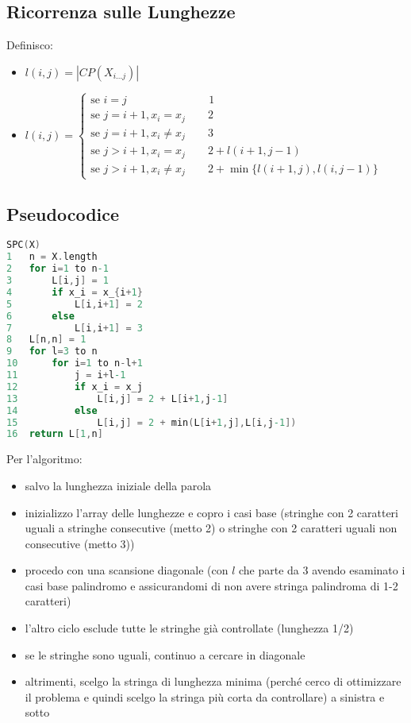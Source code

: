 \subsection{Ricorrenza sulle Lunghezze}
Definisco:
\begin{itemize}
    \item $l(i,j) = |CP(X_{i \ldots j})|$
    \item $l(i,j) = \begin{cases}
        \text{se } i = j \qquad\qquad\qquad\;\;\;\;\; 1 \\
        \text{se } j = i+1, x_i = x_j \qquad 2\\
        \text{se } j = i+1, x_i \not= x_j \qquad 3\\
        \text{se } j > i+1, x_i = x_j \qquad 2 + l(i+1,j-1)\\
        \text{se } j > i+1, x_i \not= x_j \qquad 2 + \min\{l(i+1,j),l(i,j-1)\}
    \end{cases}$
\end{itemize}

\newpage
\subsection{Pseudocodice}
\begin{mdframed}
\begin{lstlisting}[language=C]
SPC(X)
1   n = X.length
2   for i=1 to n-1
3       L[i,j] = 1
4       if x_i = x_{i+1}
5           L[i,i+1] = 2
6       else
7           L[i,i+1] = 3
8   L[n,n] = 1
9   for l=3 to n
10      for i=1 to n-l+1
11          j = i+l-1
12          if x_i = x_j
13              L[i,j] = 2 + L[i+1,j-1]
14          else
15              L[i,j] = 2 + min(L[i+1,j],L[i,j-1])
16  return L[1,n]
\end{lstlisting}
\end{mdframed}
Per l’algoritmo:
\begin{itemize}
    \item salvo la lunghezza iniziale della parola
    \item inizializzo l'array delle lunghezze e copro i casi base (stringhe con 2 caratteri uguali a stringhe consecutive (metto 2) o stringhe con 2 caratteri uguali non consecutive (metto 3))
    \item procedo con una scansione diagonale (con $l$ che parte da 3 avendo esaminato i casi base palindromo e assicurandomi di non avere stringa palindroma di 1-2 caratteri)
    \item l'altro ciclo esclude tutte le stringhe già controllate (lunghezza 1/2)
    \item se le stringhe sono uguali, continuo a cercare in diagonale
    \item altrimenti, scelgo la stringa di lunghezza minima (perché cerco di ottimizzare il problema e quindi scelgo la stringa più corta da controllare) a sinistra e sotto
\end{itemize}
